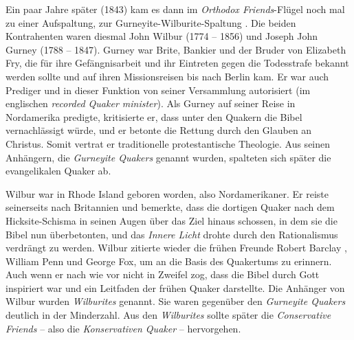 Ein paar Jahre später (1843) kam es dann im \textit{Orthodox Friends}-Flügel
noch mal zu einer Aufspaltung, zur Gurneyite-Wilburite-Spaltung
. Die beiden
Kontrahenten waren diesmal John Wilbur (1774 -- 1856) und Joseph John Gurney
(1788 -- 1847). Gurney war Brite, Bankier
 und der Bruder von Elizabeth Fry, die für
ihre Gefängnisarbeit und ihr Eintreten gegen
die Todesstrafe bekannt werden
sollte und auf ihren Missionsreisen bis nach Berlin kam.
Er war auch Prediger und in dieser Funktion
von seiner
Versammlung autorisiert (im englischen \textit{recorded Quaker minister}). Als
Gurney auf seiner Reise in Nordamerika predigte, kritisierte er, dass unter den
Quakern die Bibel vernachlässigt würde, und er betonte die
Rettung durch den Glauben an Christus. Somit vertrat er traditionelle
protestantische Theologie. Aus seinen
Anhängern, die \textit{Gurneyite Quakers}
genannt wurden, spalteten sich später die evangelikalen Quaker
 ab.

\medskip

Wilbur war in Rhode Island geboren worden, also
Nordamerikaner. Er reiste seinerseits
nach Britannien und bemerkte, dass die dortigen Quaker nach dem Hicksite-Schisma
in seinen Augen über das Ziel hinaus schossen, in dem sie die Bibel nun
überbetonten, und das \textit{Innere Licht} drohte durch den Rationalismus verdrängt
zu werden. Wilbur zitierte wieder die frühen Freunde Robert Barclay
, William
Penn und George Fox, um an die Basis des Quakertums zu erinnern. Auch wenn er
nach wie vor nicht in Zweifel zog, dass die Bibel durch Gott inspiriert war und
ein Leitfaden der frühen Quaker darstellte. Die Anhänger von Wilbur wurden
\textit{Wilburites} genannt. Sie waren gegenüber den
\textit{Gurneyite Quakers} deutlich in der Minderzahl.
Aus den \textit{Wilburites} sollte später die
\textit{Conservative Friends} -- also die
\textit{Konservativen Quaker} --
hervorgehen.

\medskip


